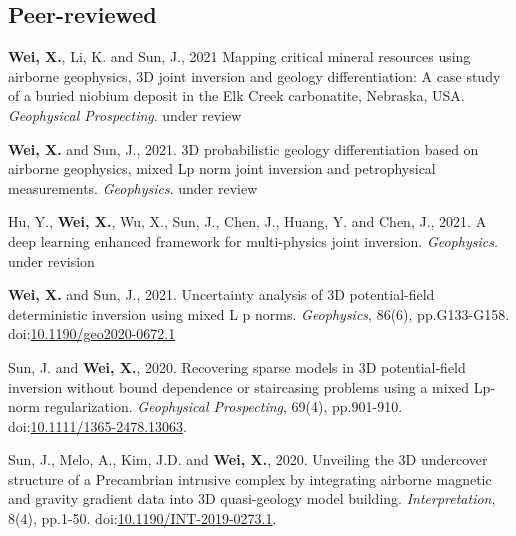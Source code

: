 \documentclass[11pt, a4paper]{article}
\newcommand{\LastName}{Wei}
\newcommand{\Initials}{X}
\newcommand{\Wei}{\textbf{\LastName, \Initials.}}  %
\newcommand{\WeiSun}{\textbf{\LastName, \Initials.} and Sun, J.}  %
\newcommand{\Review}{under review}
\newcommand{\Revision}{under revision}
\newcommand{\DOI}[1]{doi:\href{https://doi.org/#1}{#1}}
\begin{document}
\subsection*{Peer-reviewed}
\begin{etaremune}

	\item
	\Wei, Li, K. and Sun, J., 2021 Mapping critical mineral resources using airborne geophysics, 3D joint inversion and geology differentiation: A case study of a buried niobium deposit in the Elk Creek carbonatite, Nebraska, USA. \emph{Geophysical Prospecting}. \Review

	\item
	\WeiSun, 2021. 3D probabilistic geology differentiation based on airborne geophysics, mixed Lp norm joint inversion and petrophysical measurements. \emph{Geophysics}. \Review

	\item
	Hu, Y., \Wei, Wu, X., Sun, J., Chen, J., Huang, Y. and Chen, J., 2021. A deep learning enhanced framework for multi-physics joint inversion. \emph{Geophysics}. \Revision

	\item
	\WeiSun, 2021. Uncertainty analysis of 3D potential-field deterministic inversion using mixed L p norms. \emph{Geophysics}, 86(6), pp.G133-G158.
	\DOI{10.1190/geo2020-0672.1}

	\item
	Sun, J. and \Wei, 2020. Recovering sparse models in 3D potential‐field inversion without bound dependence or staircasing problems using a mixed Lp‐norm regularization. \emph{Geophysical Prospecting}, 69(4), pp.901-910.
	\DOI{10.1111/1365-2478.13063}.

	\item
	Sun, J., Melo, A., Kim, J.D. and \Wei, 2020. Unveiling the 3D undercover structure of a Precambrian intrusive complex by integrating airborne magnetic and gravity gradient data into 3D quasi-geology model building. \emph{Interpretation}, 8(4), pp.1-50.
	\DOI{10.1190/INT-2019-0273.1}.

\end{etaremune}

%
%
\end{document}
